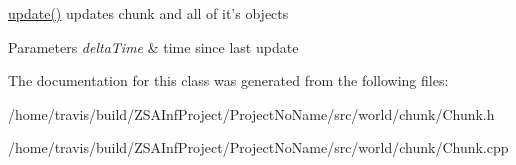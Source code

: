 \hyperlink{classChunk_aa794fcda8fe859680cbfe4a2bcd5d097}{update()} updates chunk and all of it's objects 
\begin{DoxyParams}{Parameters}
{\em delta\-Time} & time since last update \\
\hline
\end{DoxyParams}


The documentation for this class was generated from the following files\-:\begin{DoxyCompactItemize}
\item 
/home/travis/build/\-Z\-S\-A\-Inf\-Project/\-Project\-No\-Name/src/world/chunk/Chunk.\-h\item 
/home/travis/build/\-Z\-S\-A\-Inf\-Project/\-Project\-No\-Name/src/world/chunk/Chunk.\-cpp\end{DoxyCompactItemize}
